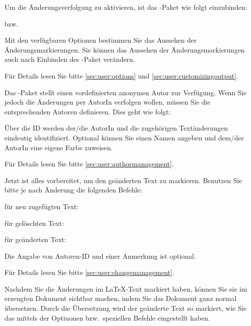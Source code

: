 
Um die Änderungsverfolgung zu aktivieren, ist das -Paket wie folgt einzubinden:


bzw.


Mit den verfügbaren Optionen bestimmen Sie das Aussehen der Änderungsmarkierungen.
Sie können das Aussehen der Änderungsmarkierungen auch nach Einbinden des -Paket verändern.

Für Details lesen Sie bitte \autoref{sec:user:options} und \autoref{sec:user:customizingoutput}.


Das -Paket stellt einen vordefinierten anonymen Autor zur Verfügung.
Wenn Sie jedoch die Änderungen per AutorIn verfolgen wollen, müssen Sie die entsprechenden Autoren definieren.
Dies geht wie folgt:


Über die ID werden der/die AutorIn und die zugehörigen Textänderungen eindeutig identifiziert.
Optional können Sie einen Namen angeben und dem/der AutorIn eine eigene Farbe zuweisen.

Für Details lesen Sie bitte \autoref{sec:user:authormanagement}.


Jetzt ist alles vorbereitet, um den geänderten Text zu markieren.
Benutzen Sie bitte je nach Änderung die folgenden Befehle:

für neu zugefügten Text:\\

für gelöschten Text:\\

für geänderten Text:\\

Die Angabe von Autoren-ID und einer Anmerkung ist optional.

Für Details lesen Sie bitte \autoref{sec:user:changemanagement}.


Nachdem Sie die Änderungen im \LaTeX-Text markiert haben, können Sie sie im erzeugten Dokument sichtbar machen, indem Sie das Dokument ganz normal übersetzen.
Durch die Übersetzung wird der geänderte Text so markiert, wie Sie das mittels der Optiuonen bzw.\ speziellen Befehle eingestellt haben.

